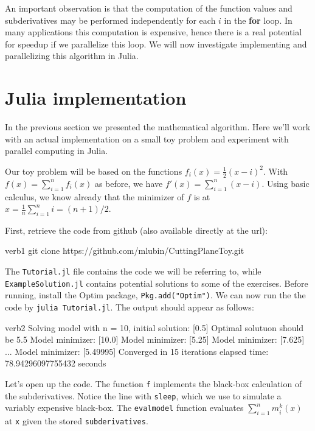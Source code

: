 \documentclass[12pt]{article}
\theoremstyle{definition}
\begin{document}
An important observation is that the computation of the function values and subderivatives may be performed independently for each $i$ in the \textbf{for} loop. In many applications this computation is expensive, hence there is a real potential for speedup if we parallelize this loop. We will now investigate implementing and parallelizing this algorithm in Julia.

\section{Julia implementation}
In the previous section we presented the mathematical algorithm. Here we'll work with an actual implementation on a small toy problem and experiment with parallel computing in Julia.

Our toy problem will be based on the functions $f_i(x) = \frac{1}{2}(x-i)^2$. With $f(x) = \sum_{i=1}^n f_i(x)$ as before, we have $f'(x) = \sum_{i=1}^n (x-i)$. Using basic calculus, we know already that the minimizer of $f$ is at $x = \frac{1}{n}\sum_{i=1}^n i = (n+1)/2$.

First, retrieve the code from github (also available directly at the url):

\begin{center}
\begin{SaveVerbatim}{verb1}
git clone https://github.com/mlubin/CuttingPlaneToy.git
\end{SaveVerbatim}
\end{center}
The \texttt{Tutorial.jl} file contains the code we will be referring to, while \texttt{ExampleSolution.jl} contains potential solutions to some of the exercises.
Before running, install the Optim package, \texttt{Pkg.add("Optim")}. We can now run the the code by \texttt{julia Tutorial.jl}. The output should appear as follows:
\begin{center}
\begin{SaveVerbatim}{verb2}
Solving model with n = 10, initial solution: [0.5]
Optimal solutuon should be 5.5
Model minimizer: [10.0]
Model minimizer: [5.25]
Model minimizer: [7.625]
...
Model minimizer: [5.49995]
Converged in 15 iterations
elapsed time: 78.94296097755432 seconds
\end{SaveVerbatim}
\end{center}

Let's open up the code. The function \texttt{f} implements the black-box calculation of the subderivatives. Notice the line with \texttt{sleep}, which we use to simulate a variably expensive black-box. The \texttt{evalmodel} function evaluates $\sum_{i=1}^n m_i^k(x)$ at \texttt{x} given the stored \texttt{subderivatives}. 
\end{document}
